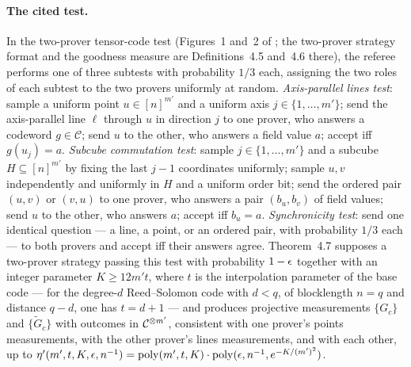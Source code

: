 \documentclass[11pt]{article}
\begin{document}
\paragraph{The cited test.}
In the two-prover tensor-code test (Figures~1 and~2 of
\cite{Ji2021Quantum}; the two-prover strategy format and the goodness
measure are Definitions~4.5 and~4.6 there), the referee performs one of
three subtests with probability $1/3$ each, assigning the two roles of each
subtest to the two provers uniformly at random.  \emph{Axis-parallel lines
test}: sample a uniform point $u \in [n]^{m'}$ and a uniform axis
$j \in \{1,\ldots,m'\}$; send the axis-parallel line $\ell$ through $u$ in
direction $j$ to one prover, who answers a codeword $g \in \mathcal C$;
send $u$ to the other, who answers a field value $a$; accept iff
$g(u_j) = a$.  \emph{Subcube commutation test}: sample
$j \in \{1,\ldots,m'\}$ and a subcube $H \subseteq [n]^{m'}$ by fixing the
last $j-1$ coordinates uniformly; sample $u, v$ independently and uniformly
in $H$ and a uniform order bit; send the ordered pair $(u,v)$ or $(v,u)$ to
one prover, who answers a pair $(b_u, b_v)$ of field values; send $u$ to
the other, who answers $a$; accept iff $b_u = a$.  \emph{Synchronicity
test}: send one identical question --- a line, a point, or an ordered
pair, with probability $1/3$ each --- to both provers and accept iff their
answers agree.  Theorem~4.7 supposes a two-prover strategy passing this
test with probability $1-\epsilon$ together with an integer parameter
$K \ge 12 m' t$, where $t$ is the interpolation parameter of the base code
--- for the degree-$d$ Reed--Solomon code with $d<q$, of blocklength $n = q$ and
distance $q-d$, one has $t = d+1$ --- and produces projective measurements
$\{G_c\}$ and $\{\tilde G_c\}$ with outcomes in $\mathcal C^{\otimes m'}$,
consistent with one prover's points measurements, with the other prover's
lines measurements, and with each other, up to
$\eta'(m',t,K,\epsilon,n^{-1}) = \mathrm{poly}(m',t,K) \cdot
\mathrm{poly}(\epsilon, n^{-1}, e^{-K/(m')^2})$.
\end{document}
